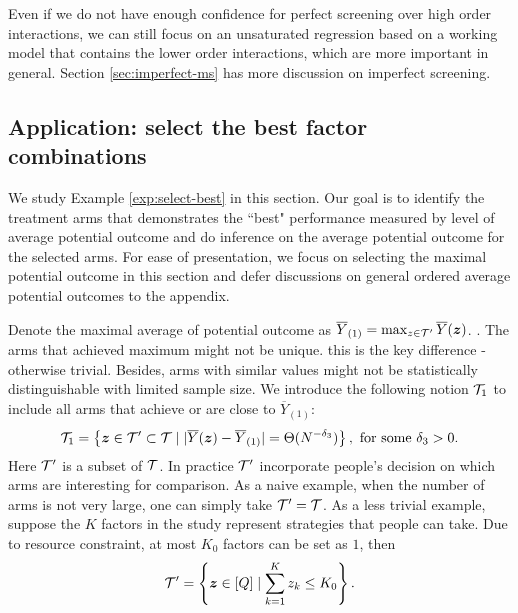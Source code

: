 \documentclass[12pt]{article}
\begin{document}
Even if we do not have enough confidence for perfect screening over high order interactions, we can still focus on an unsaturated regression based on a working model that contains the lower order interactions, which are more important in general. Section \ref{sec:imperfect-ms} has more discussion on imperfect screening.




\subsection{Application: select the best factor combinations} \label{sec:select-best}


We study Example \ref{exp:select-best} in this section. Our goal is to identify the treatment arms that demonstrates the ``best" performance measured by level of average potential outcome and do inference on the average potential outcome for the selected arms. For ease of presentation, we focus on selecting the maximal potential outcome in this section and defer discussions on general ordered average potential outcomes to the appendix. 

Denote the maximal average of potential outcome as $\overline{Y}_{(1)} = \max_{z\in{\mathcal{T}}'} \overline{Y}({\boldsymbol{z}})$. . The arms that achieved maximum might not be unique. {\color{red} this is the key difference - otherwise trivial}. Besides, arms with similar values might not be statistically distinguishable with limited sample size. We introduce the following notion ${\mathcal{T}}_{1}$ to include all arms that achieve or are close to $\overline{Y}_{(1)}$:
\begin{align}\label{eqn:near-tie}
    {\mathcal{T}}_{1} = \left\{{\boldsymbol{z}}\in{\mathcal{T}}'\subset {\mathcal{T}}\mid|\overline{Y}({\boldsymbol{z}}) - \overline{Y}_{(1)}| =  \Theta(N^{-\delta_3})\right\},  \text{ for some } \delta_3 > 0.
\end{align}
Here ${\mathcal{T}}'$ is a subset of ${\mathcal{T}}$. In practice ${\mathcal{T}}'$ incorporate people's decision on which arms are interesting for comparison. As a naive example, when the number of arms is not very large, one can simply take $ {\mathcal{T}}' = {\mathcal{T}}$. As a less trivial example, suppose the $K$ factors in the study represent strategies that people can take. Due to resource constraint, at most $K_0$ factors can be set as $1$, then 
\begin{align*}
{\mathcal{T}}' = \left\{{\boldsymbol{z}}\in[Q]\mid \sum_{k=1}^{K}z_k \le K_0\right\}.
\end{align*}
\end{document}
